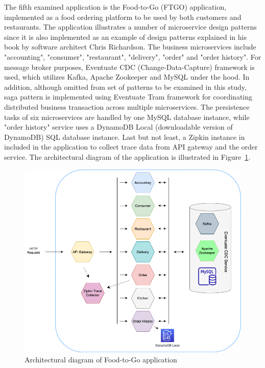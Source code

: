 \documentclass{Configuration_Files/PoliMi3i_thesis}
\begin{document}
The fifth examined application is the Food-to-Go (FTGO) application, implemented as a food ordering platform to be used by both customers and restaurants.
The application illustrates a number of microservice design patterns since it is also implemented as an example of design patterns explained in his book by software architect Chris Richardson\footnotemark[86].
The business microservices include "accounting", "consumer", "restaurant", "delivery", "order" and "order history".
For message broker purposes, Eventuate CDC (Change-Data-Capture)\footnotemark[87] framework is used, which utilizes Kafka, Apache Zookeeper and MySQL under the hood.
In addition, although omitted from set of patterns to be examined in this study, saga pattern is implemented using Eventuate Tram\footnotemark[88] framework for coordinating distributed business transaction across multiple microservices.
The persistence tasks of six microservices are handled by one MySQL database instance, while "order history" service uses a DynamoDB\footnotemark[89] Local (downloadable version of DynamoDB) SQL database instance.
Last but not least, a Zipkin instance in included in the application to collect trace data from API gateway and the order service.
The architectural diagram of the application is illustrated in Figure~\ref{fig:R5_arch}.

\begin{figure}[H]
\centering
\includegraphics[width=1\textwidth]{myImages/R5.png}
\caption{Architectural diagram of Food-to-Go application}
\label{fig:R5_arch}
\end{figure}
\end{document}
